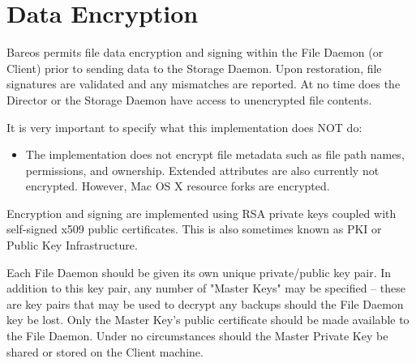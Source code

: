 
\chapter{Data Encryption}
\label{DataEncryption}

Bareos permits file data encryption and signing within the File Daemon (or
Client) prior to sending data to the Storage Daemon.  Upon restoration,
file signatures are validated and any mismatches are reported.  At no time
does the Director or the Storage Daemon have access to unencrypted file
contents.


It is very important to specify what this implementation does NOT
do:
\begin{itemize}

\item The implementation does not encrypt file metadata such as file path
  names, permissions, and ownership. Extended attributes are also currently
  not encrypted. However, Mac OS X resource forks are encrypted.
\end{itemize}

Encryption and signing are implemented using RSA private keys coupled with
self-signed x509 public certificates. This is also sometimes known as PKI
or Public Key Infrastructure.

Each File Daemon should be given its own unique private/public key pair.
In addition to this key pair, any number of "Master Keys" may be specified
-- these are key pairs that may be used to decrypt any backups should the
File Daemon key be lost.  Only the Master Key's public certificate should
be made available to the File Daemon.  Under no circumstances should the
Master Private Key be shared or stored on the Client machine.

